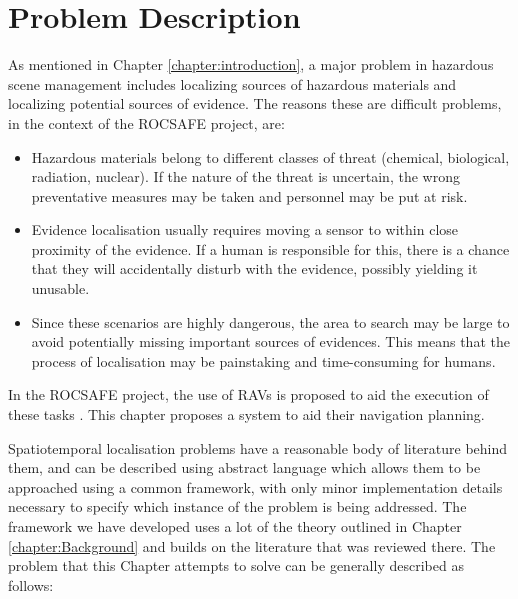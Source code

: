 \section{Problem Description}\label{sec:TLocalisationProbDescription}
As mentioned in Chapter \ref{chapter:introduction}, a major problem in hazardous scene management includes localizing sources of hazardous materials and localizing potential sources of evidence. The reasons these are difficult problems, in the context of the ROCSAFE project, are:
\begin{itemize}
    \item Hazardous materials belong to different classes of threat (chemical, biological, radiation, nuclear). If the nature of the threat is uncertain, the wrong preventative measures may be taken and personnel may be put at risk. 
    \item Evidence localisation usually requires moving a sensor to within close proximity of the evidence. If a human is responsible for this, there is a chance that they will accidentally disturb with the evidence, possibly yielding it unusable.
    \item Since these scenarios are highly dangerous, the area to search may be large to avoid potentially missing important sources of evidences. This means that the process of localisation may be painstaking and time-consuming for humans.
\end{itemize}
In the ROCSAFE project, the use of RAVs is proposed to aid the execution of these tasks \cite{Bagherzadeh2017ROCSAFE:Incidents}. This chapter proposes a system to aid their navigation planning.

  



Spatiotemporal localisation problems have a reasonable body of literature behind them, and can be described using abstract language which allows them to be approached using a common framework, with only minor implementation details necessary to specify which instance of the problem is being addressed. The framework we have developed uses a lot of the theory outlined in Chapter \ref{chapter:Background} and builds on the literature that was reviewed there. The problem that this Chapter attempts to solve can be generally described as follows: \par

